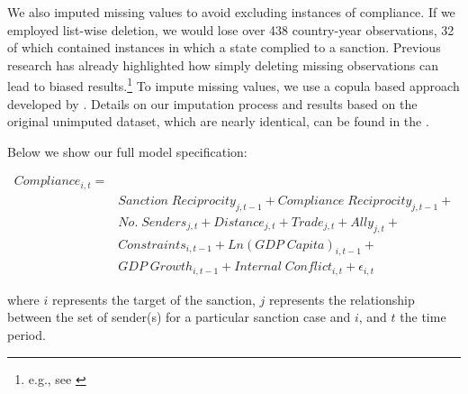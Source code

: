 We also imputed missing values to avoid excluding instances of compliance. If we employed list-wise deletion, we would lose over 438 country-year observations, 32 of which contained instances in which a state complied to a sanction. Previous research has already highlighted how simply deleting missing observations can lead to biased results.\footnote{e.g., see \citealp{rubin1976inference,honaker2010missing}} To impute missing values, we use a copula based approach developed by \citet{hoff:2007}. Details on our imputation process and results based on the original unimputed dataset, which are nearly identical, can be found in the . 

Below we show our full model specification: 

\begin{align*}
		Compliance_{i,t} =& \\
		&Sanction \; Reciprocity_{j,t-1} + Compliance \; Reciprocity_{j,t-1} + \\
		&No. \; Senders_{j,t} + Distance_{j,t} + Trade_{j,t} + Ally_{j,t} + \\
		&Constraints_{i,t-1} + Ln(GDP \; Capita)_{i,t-1} +\\
		&GDP \; Growth_{i,t-1} + Internal \; Conflict_{i,t} + \epsilon_{i,t}
\end{align*}

where $i$ represents the target of the sanction, $j$ represents the relationship between the set of sender(s) for a particular sanction case and $i$, and $t$ the time period.
